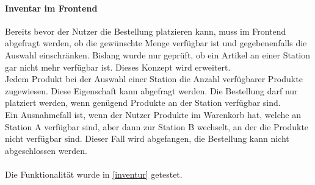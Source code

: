 \paragraph{Inventar im Frontend}
Bereits bevor der Nutzer die Bestellung platzieren kann, muss im Frontend abgefragt werden, ob die gewünschte Menge verfügbar ist und gegebenenfalls die Auswahl einschränken. Bislang wurde nur geprüft, ob ein Artikel an einer Station gar nicht mehr verfügbar ist. Dieses Konzept wird erweitert. \\
Jedem Produkt bei der Auswahl einer Station die Anzahl verfügbarer Produkte zugewiesen. Diese Eigenschaft kann abgefragt werden.  Die Bestellung darf nur platziert werden, wenn genügend Produkte an der Station verfügbar sind. \\
Ein Ausnahmefall ist, wenn der Nutzer Produkte im Warenkorb hat, welche an Station A verfügbar sind, aber dann zur Station B wechselt, an der die Produkte nicht verfügbar sind. Dieser Fall wird abgefangen, die Bestellung kann nicht abgeschlossen werden. \\\\
Die Funktionalität wurde in \ref{inventur} getestet. 	 

